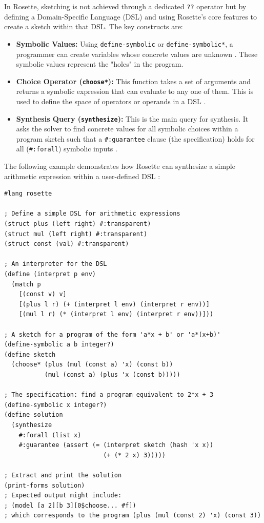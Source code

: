 \documentclass[12pt, a4paper]{report}
\begin{document}
In Rosette, sketching is not achieved through a dedicated \texttt{??} operator but by defining a Domain-Specific Language (DSL) and using Rosette's core features to create a sketch within that DSL. The key constructs are:
\begin{itemize}
    \item \textbf{Symbolic Values:} Using \texttt{define-symbolic} or \texttt{define-symbolic*}, a programmer can create variables whose concrete values are unknown \citep{torlak2013rosette}. These symbolic values represent the "holes" in the program.
    \item \textbf{Choice Operator (\texttt{choose*}):} This function takes a set of arguments and returns a symbolic expression that can evaluate to any one of them. This is used to define the space of operators or operands in a DSL \citep{torlak2013rosette}.
    \item \textbf{Synthesis Query (\texttt{synthesize}):} This is the main query for synthesis. It asks the solver to find concrete values for all symbolic choices within a program sketch such that a \texttt{\#:guarantee} clause (the specification) holds for all (\texttt{\#:forall}) symbolic inputs \citep{torlak2013rosette}.
\end{itemize}

The following example demonstrates how Rosette can synthesize a simple arithmetic expression within a user-defined DSL \citep{torlak2013rosette}:
\begin{verbatim}
#lang rosette

; Define a simple DSL for arithmetic expressions
(struct plus (left right) #:transparent)
(struct mul (left right) #:transparent)
(struct const (val) #:transparent)

; An interpreter for the DSL
(define (interpret p env)
  (match p
    [(const v) v]
    [(plus l r) (+ (interpret l env) (interpret r env))]
    [(mul l r) (* (interpret l env) (interpret r env))]))

; A sketch for a program of the form 'a*x + b' or 'a*(x+b)'
(define-symbolic a b integer?)
(define sketch
  (choose* (plus (mul (const a) 'x) (const b))
           (mul (const a) (plus 'x (const b)))))

; The specification: find a program equivalent to 2*x + 3
(define-symbolic x integer?)
(define solution
  (synthesize
    #:forall (list x)
    #:guarantee (assert (= (interpret sketch (hash 'x x))
                           (+ (* 2 x) 3)))))

; Extract and print the solution
(print-forms solution)
; Expected output might include:
; (model [a 2][b 3][0$choose... #f])
; which corresponds to the program (plus (mul (const 2) 'x) (const 3))
\end{verbatim}
\end{document}
